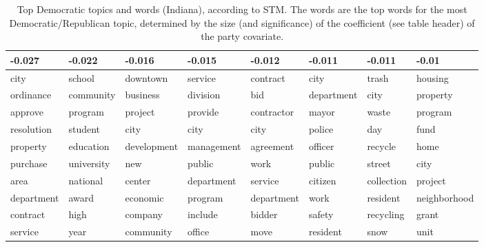 \begin{table}[ht]
\centering
\begin{tabular}{llllllll}
  \hline
-0.027 & -0.022 & -0.016 & -0.015 & -0.012 & -0.011 & -0.011 & -0.01 \\ 
  \hline
city & school & downtown & service & contract & city & trash & housing \\ 
  ordinance & community & business & division & bid & department & city & property \\ 
  approve & program & project & provide & contractor & mayor & waste & program \\ 
  resolution & student & city & city & city & police & day & fund \\ 
  property & education & development & management & agreement & officer & recycle & home \\ 
  purchase & university & new & public & work & public & street & city \\ 
  area & national & center & department & service & citizen & collection & project \\ 
  department & award & economic & program & department & work & resident & neighborhood \\ 
  contract & high & company & include & bidder & safety & recycling & grant \\ 
  service & year & community & office & move & resident & snow & unit \\ 
   \hline
\end{tabular}
\caption{Top Democratic topics and words (Indiana), according to STM. 
The words are the top words for the most Democratic/Republican topic, determined
by the size (and significance) of the coefficient (see table header) of the party covariate.} 
\label{tabSTMINDem}
\end{table}

